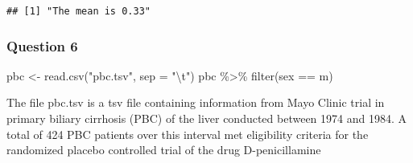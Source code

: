 \documentclass[
]{article}
\newenvironment{Shaded}{\begin{snugshade}}{\end{snugshade}}
\newcommand{\AttributeTok}[1]{\textcolor[rgb]{0.77,0.63,0.00}{#1}}
\newcommand{\FunctionTok}[1]{\textcolor[rgb]{0.00,0.00,0.00}{#1}}
\newcommand{\NormalTok}[1]{#1}
\newcommand{\OtherTok}[1]{\textcolor[rgb]{0.56,0.35,0.01}{#1}}
\newcommand{\SpecialCharTok}[1]{\textcolor[rgb]{0.00,0.00,0.00}{#1}}
\newcommand{\StringTok}[1]{\textcolor[rgb]{0.31,0.60,0.02}{#1}}
\begin{document}
\begin{verbatim}
## [1] "The mean is 0.33"
\end{verbatim}

\hypertarget{question-6}{%
\subsubsection{Question 6}\label{question-6}}

\begin{Shaded}
\begin{Highlighting}[]
\NormalTok{pbc }\OtherTok{\textless{}{-}} \FunctionTok{read.csv}\NormalTok{(}\StringTok{"pbc.tsv"}\NormalTok{, }\AttributeTok{sep =} \StringTok{"}\SpecialCharTok{\textbackslash{}t}\StringTok{"}\NormalTok{)}
\NormalTok{pbc }\SpecialCharTok{\%\textgreater{}\%}
  \FunctionTok{filter}\NormalTok{(sex }\SpecialCharTok{==} \StringTok{\textquotesingle{}m\textquotesingle{}}\NormalTok{)}
\end{Highlighting}
\end{Shaded}

The file pbc.tsv is a tsv file containing information from Mayo Clinic
trial in primary biliary cirrhosis (PBC) of the liver conducted between
1974 and 1984. A total of 424 PBC patients over this interval met
eligibility criteria for the randomized placebo controlled trial of the
drug D-penicillamine
\end{document}
